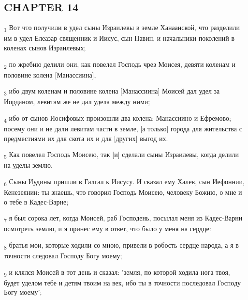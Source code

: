 \subsection{CHAPTER 14}
\begin{tcolorbox}
\textsubscript{1} Вот что получили в удел сыны Израилевы в земле Ханаанской, что разделили им в удел Елеазар священник и Иисус, сын Навин, и начальники поколений в коленах сынов Израилевых;
\end{tcolorbox}
\begin{tcolorbox}
\textsubscript{2} по жребию делили они, как повелел Господь чрез Моисея, девяти коленам и половине колена [Манассиина],
\end{tcolorbox}
\begin{tcolorbox}
\textsubscript{3} ибо двум коленам и половине колена [Манассиина] Моисей дал удел за Иорданом, левитам же не дал удела между ними;
\end{tcolorbox}
\begin{tcolorbox}
\textsubscript{4} ибо от сынов Иосифовых произошли два колена: Манассиино и Ефремово; посему они и не дали левитам части в земле, [а только] города для жительства с предместиями их для скота их и для [других] выгод их.
\end{tcolorbox}
\begin{tcolorbox}
\textsubscript{5} Как повелел Господь Моисею, так [и] сделали сыны Израилевы, когда делили на уделы землю.
\end{tcolorbox}
\begin{tcolorbox}
\textsubscript{6} Сыны Иудины пришли в Галгал к Иисусу. И сказал ему Халев, сын Иефоннии, Кенезеянин: ты знаешь, что говорил Господь Моисею, человеку Божию, о мне и о тебе в Кадес-Варне;
\end{tcolorbox}
\begin{tcolorbox}
\textsubscript{7} я был сорока лет, когда Моисей, раб Господень, посылал меня из Кадес-Варни осмотреть землю, и я принес ему в ответ, что было у меня на сердце:
\end{tcolorbox}
\begin{tcolorbox}
\textsubscript{8} братья мои, которые ходили со мною, привели в робость сердце народа, а я в точности следовал Господу Богу моему;
\end{tcolorbox}
\begin{tcolorbox}
\textsubscript{9} и клялся Моисей в тот день и сказал: 'земля, по которой ходила нога твоя, будет уделом тебе и детям твоим на век, ибо ты в точности последовал Господу Богу моему';
\end{tcolorbox}
